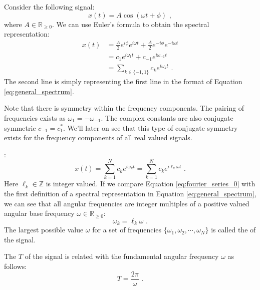 Consider the following signal:
\begin{equation}
x(t)=A\cos(\omega t+\phi) \,\,,
\end{equation}
where $A\in \mathbb{R}_{\ge 0}$. We can use Euler's formula to obtain the spectral representation:
\begin{align}
x(t) & = \frac{A}{2}e^{i\phi}e^{i\omega t} + \frac{A}{2}e^{-i\phi}e^{-i\omega t} \\
     & = c_1 e^{i\omega_1 t} + c_{-1} e^{i\omega_{-1} t} \\
     & = \sum_{k\in\{-1,1\}} c_k e^{i\omega_k t} \,\,.
\end{align}
The second line is simply representing the first line in the format of Equation \ref{eq:general_spectrum}.

Note that there is symmetry within the frequency components. The pairing of frequencies exists as $\omega_{1}=-\omega_{-1}$. 
The complex constants are also conjugate symmetric $c_{-1} = c_{1}^*$. We'll later on see that this type of conjugate symmetry exists for the frequency components of all real valued signals.

:
\begin{equation}
x(t) = \sum_{k=1}^N c_k e^{i \omega_k t} = \sum_{k=1}^N c_k e^{i \ell_k \omega t} \,\,.
\label{eq:fourier_series_0}
\end{equation}
Here $\ell_k \in \mathbb{Z}$ is integer valued. If we compare Equation \ref{eq:fourier_series_0} with the first definition of a spectral representation in Equation \ref{eq:general_spectrum}, we can see that all angular frequencies are integer multiples of a positive valued angular base frequency $\omega \in \mathbb{R}_{\ge 0}$:
\begin{equation}
\omega_k = \ell_k\omega \,\,.
\label{eq:integer_multiple}
\end{equation}
The largest possible value $\omega$ for a set of frequencies $\{\omega_1,\omega_2,\cdots,\omega_N\}$ is called the \emph{} of the signal.

The \emph{} $T$ of the signal is related with the fundamental angular frequency $\omega$ as follows:
\begin{equation}
\boxed{
T = \frac{2\pi}{\omega}
} \,\,.
\label{eq:fundamental_period}
\end{equation}

